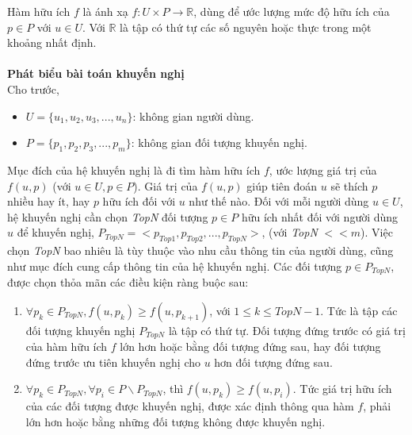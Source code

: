 Hàm hữu ích $f$ là ánh xạ $f: U \times P \rightarrow \mathbb{R}$, dùng để ước lượng mức độ hữu ích của $p \in P$ với $u \in U$. Với $\mathbb{R}$ là tập có thứ tự các số nguyên hoặc thực trong một khoảng nhất định.\\\\  
\textbf{Phát biểu bài toán khuyến nghị}\\
Cho trước,
\begin{itemize}
\item $U = \{u_{1}, u_{2}, u_{3}, ..., u_{n}\}$: không gian người dùng.
\item $P = \{p_{1}, p_{2}, p_{3}, ..., p_{m}\}$: không gian đối tượng khuyến nghị. 
\end{itemize}

Mục đích của hệ khuyến nghị là đi tìm hàm hữu ích $f$, ước lượng giá trị của $f(u,p)$ (với $u \in U, p \in P$). Giá trị của $f(u,p)$ giúp tiên đoán $u$ sẽ thích $p$ nhiều hay ít, hay $p$ hữu ích đối với $u$ như thế nào. Đối với mỗi người dùng $u \in U$, hệ khuyến nghị cần chọn \textit{TopN} đối tượng $p \in P$ hữu ích nhất đối với người dùng $u$ để khuyến nghị, $P_{TopN} = <p_{Top1}, p_{Top2}, ..., p_{TopN}>$, (với \textit{TopN} $<< m$). Việc chọn \textit{TopN} bao nhiêu là tùy thuộc vào nhu cầu thông tin của người dùng, cũng như mục đích cung cấp thông tin của hệ khuyến nghị. Các đối tượng $p \in P_{TopN}$, được chọn thỏa mãn các điều kiện ràng buộc sau:

\begin{enumerate}
\item $\forall p_{k} \in P_{TopN}, f(u,p_{k}) \geq f(u,p_{k+1})$, với $1 \leq k \leq TopN-1$. Tức là tập các đối tượng khuyến nghị $P_{TopN}$ là tập có thứ tự. Đối tượng đứng trước có giá trị của hàm hữu ích $f$ lớn hơn hoặc bằng đối tượng đứng sau, hay đối tượng đứng trước ưu tiên khuyến nghị cho $u$ hơn đối tượng đứng sau.
\item $\forall p_{k} \in P_{TopN}, \forall p_{i} \in P \backslash P_{TopN}$, thì $f(u,p_{k}) \geq f(u,p_{i})$. Tức giá trị hữu ích của các đối tượng được khuyến nghị, được xác định thông qua hàm $f$, phải lớn hơn hoặc bằng những đối tượng không được khuyến nghị.
\end{enumerate} 

